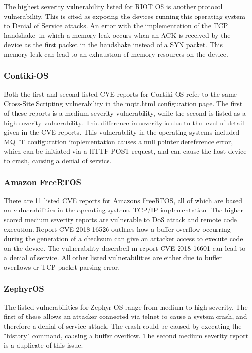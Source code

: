 The highest severity vulnerability listed for RIOT OS is another protocol
vulnerability. This is cited as exposing the devices running this operating
system to Denial of Service attacks. An error with the implementation of the TCP
handshake, in which a memory leak occurs when an ACK is received by the device
as the first packet in the handshake instead of a SYN packet\cite{riotCve3}. This memory leak
can lead to an exhaustion of memory resources on the device.

\subsubsection{\textbf{Contiki-OS}}

Both the first and second listed CVE reports for Contiki-OS refer to the same
Cross-Site Scripting vulnerability in the mqtt.html configuration page. The
first of these reports is a medium severity vulnerability\cite{contikiCve1},
while the second is listed as a high severity vulnerability\cite{contikiCve2}.
This difference in severity is due to the level of detail given in the CVE
reports. This vulnerability in the operating systems included MQTT configuration
implementation causes a null pointer dereference error, which can be initiated
via a HTTP POST request, and can cause the host device to crash, causing a denial of
service\cite{contikiMqtt}.

\subsubsection{\textbf{Amazon FreeRTOS}}

There are 11 listed CVE reports for Amazons FreeRTOS\cite{awsCve}, all of which are based on
vulnerabilities in the operating systems TCP/IP implementation. The higher
scored medium severity reports are vulnerable to DoS attack and remote code
execution. Report CVE-2018-16526\cite{awsCve1} outlines how a buffer overflow occurring during
the generation of a checksum can give an attacker access to execute code on the
device. The vulnerability described in report CVE-2018-16601\cite{awsCve2} can
lead to a denial of service. All other listed vulnerabilities are either due to
buffer overflows or TCP packet parsing error.

\subsubsection{\textbf{ZephyrOS}}

The listed vulnerabilities for Zephyr OS range from medium to high
severity\cite{zepCve}. The first of these allows an attacker connected via
telnet to cause a system crash, and therefore a denial of service attack. The
crash could be caused by executing the "history" command, causing a buffer
overflow\cite{zepCve1}. The second medium severity report is a duplicate of this
issue.


